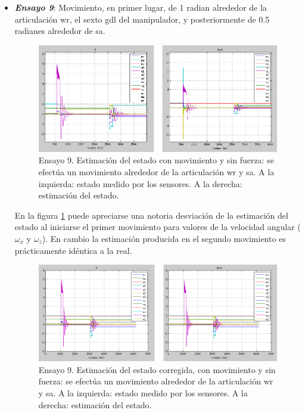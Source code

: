 \begin{itemize}
\item \textbf{\emph{Ensayo 9}}: Movimiento, en primer lugar, de 1 radian alrededor de la articulación \acrshort{wr}, el sexto \acrshort{gdl} del manipulador, y posteriormente de 0.5 radianes alrededor de \acrshort{sa}. \par 

\begin{figure}[h!]
\centering
\includegraphics[scale=0.4]{Figuras/cmsf-X-WRSA}
\caption[Ensayo 9. Estimación del estado con movimiento y sin fuerza]{Ensayo 9. Estimación del estado con movimiento y sin fuerza: se efectúa un movimiento alrededor de la articulación \acrshort{wr} y \acrshort{sa}. A la izquierda: estado medido por los sensores. A la derecha: estimación del estado.}
\label{fig:cmsf-X-WRSA}
\end{figure}

En la figura \ref{fig:cmsf-X-WRSA} puede apreciarse una notoria desviación de la estimación del estado al iniciarse el primer movimiento para valores de la velocidad angular ($\omega_x$ y $\omega_z$). En cambio la estimación producida en el segundo movimiento es prácticamente idéntica a la real. \par 

\begin{figure}[h!]
\centering
\includegraphics[scale=0.4]{Figuras/cmsf-X-WRSA2}
\caption[Ensayo 9. Estimación del estado corregida, con movimiento y sin fuerza]{Ensayo 9. Estimación del estado corregida, con movimiento y sin fuerza: se efectúa un movimiento alrededor de la articulación \acrshort{wr} y \acrshort{sa}. A la izquierda: estado medido por los sensores. A la derecha: estimación del estado.}
\label{fig:cmsf-X-WRSA2}
\end{figure}


\end{itemize}
